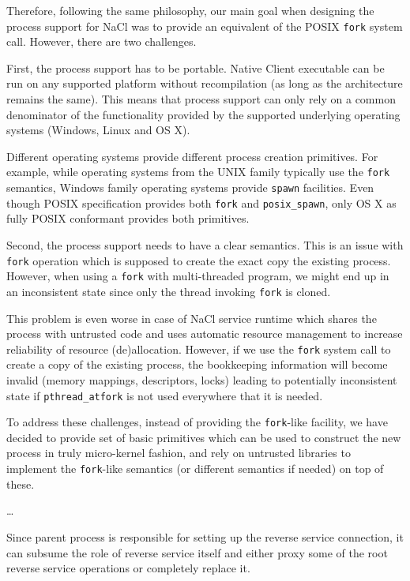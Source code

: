 Therefore, following the same philosophy, our main goal when designing
the process support for NaCl was to provide an equivalent of the POSIX
\lstinline`fork` system call. However, there are two challenges.

First, the process support has to be portable. Native Client executable
can be run on any supported platform without recompilation (as long as
the architecture remains the same). This means that process support can
only rely on a common denominator of the functionality provided by the
supported underlying operating systems (\ie Windows, Linux and OS X).

Different operating systems provide different process creation
primitives. For example, while operating systems from the UNIX family
typically use the \lstinline`fork` semantics, Windows family operating
systems provide \lstinline`spawn` facilities. Even though POSIX
specification provides both \lstinline`fork` and \lstinline`posix_spawn`,
only OS X as fully POSIX conformant provides both primitives.

Second, the process support needs to have a clear semantics. This is an
issue with \lstinline`fork` operation which is supposed to create the
exact copy the existing process. However, when using a \lstinline`fork`
with multi-threaded program, we might end up in an inconsistent state
since only the thread invoking \lstinline`fork` is cloned.

This problem is even worse in case of NaCl service runtime which shares
the process with untrusted code and uses automatic resource management
to increase reliability of resource (de)allocation. However, if we use
the \lstinline`fork` system call to create a copy of the existing process,
the bookkeeping information will become invalid (\eg memory mappings,
descriptors, locks) leading to potentially inconsistent state if
\lstinline`pthread_atfork` is not used everywhere that it is needed.

To address these challenges, instead of providing the
\lstinline`fork`-like facility, we have decided to provide set of basic
primitives which can be used to construct the new process in truly
micro-kernel fashion, and rely on untrusted libraries to implement the
\lstinline`fork`-like semantics (\eg or different semantics if needed) on
top of these.

\ldots

Since parent process is responsible for setting up the reverse service
connection, it can subsume the role of reverse service itself and either
proxy some of the root reverse service operations or completely replace
it.

